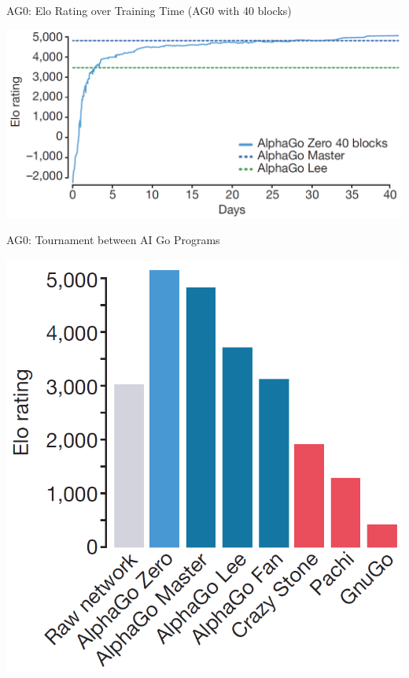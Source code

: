 \documentclass{beamer}
\begin{document}
{    \begin{frame}{AG0: Elo Rating over Training Time (AG0 with 40 blocks)}
      \begin{center}
        \includegraphics[width=\textwidth]{../img/AG0-paper/AG0-40-elo-vs-training-days.png}
      \end{center}
    \end{frame}

    \begin{frame}{AG0: Tournament between AI Go Programs}
      \begin{center}
        \includegraphics[height=.9\textheight]{../img/AG0-paper/elo-from-tournament.png}
      \end{center}
    \end{frame}

}
\end{document}
